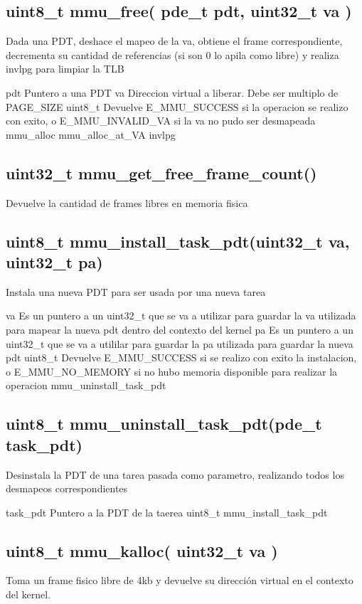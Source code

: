 \documentclass[a4paper,10pt]{article}
\begin{document}
\subsection*{uint8\_t mmu\_free( pde\_t  pdt, uint32\_t va )}
   Dada una PDT, deshace el mapeo de la va, obtiene el frame correspondiente, decrementa su cantidad de 
   referencias (si son 0 lo apila como libre) y realiza invlpg para limpiar la TLB
  
     pdt Puntero a una PDT
     va  Direccion virtual a liberar. Debe ser multiplo de PAGE\_SIZE
     uint8\_t Devuelve E\_MMU\_SUCCESS si la operacion se realizo con exito, o E\_MMU\_INVALID\_VA si la va no pudo ser desmapeada
     mmu\_alloc
     mmu\_alloc\_at\_VA
     invlpg
   
\subsection*{uint32\_t mmu\_get\_free\_frame\_count()}
Devuelve la cantidad de frames libres en memoria fisica

\subsection*{uint8\_t mmu\_install\_task\_pdt(uint32\_t  va, uint32\_t  pa)}

   Instala una nueva PDT para ser usada por una nueva tarea
  
     va Es un puntero a un uint32\_t que se va a utilizar para guardar la va utilizada para mapear la nueva pdt dentro del contexto del kernel
     pa Es un puntero a un uint32\_t que se va a utililar para guardar la pa utilizada para guardar la nueva pdt
     uint8\_t Devuelve E\_MMU\_SUCCESS si se realizo con exito la instalacion, o E\_MMU\_NO\_MEMORY si no hubo memoria disponible para realizar la operacion  
     mmu\_uninstall\_task\_pdt
     
\subsection*{uint8\_t mmu\_uninstall\_task\_pdt(pde\_t  task\_pdt)}
   Desinstala la PDT de una tarea pasada como parametro, realizando todos los desmapeos correspondientes
   
     task\_pdt Puntero a la PDT de la taerea
     uint8\_t
     mmu\_install\_task\_pdt 
   
\subsection*{uint8\_t mmu\_kalloc( uint32\_t  va )}
   Toma un frame fisico libre de 4kb y devuelve su dirección virtual en el contexto del kernel.
  
\end{document}
